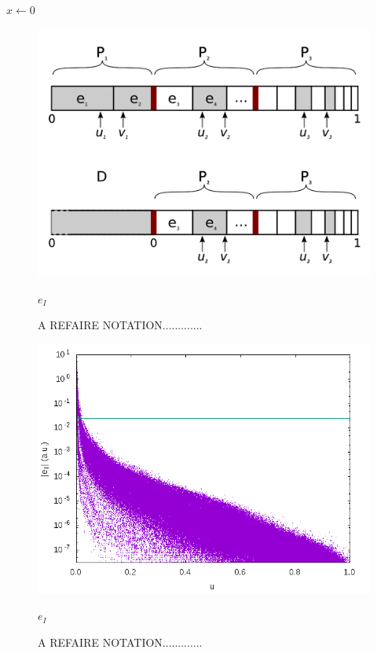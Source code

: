 \documentclass[./thesis.tex]{subfiles}
\begin{document}
\begin{algorithm}
	
					
	$x \gets 0$ \;
\end{algorithm}



\begin{figure}[h!]
	\begin{center}
		\includegraphics[width=0.9\columnwidth]{figures/pt2/move_to_deterministic}
		\caption{A REFAIRE NOTATION.............}
		\label{fig:move_to_deterministic}
		$e_I$
	\end{center}
\end{figure}

\begin{figure}[h!]
	\begin{center}
		\includegraphics[width=0.9\columnwidth]{figures/pt2/eI}
		\caption{A REFAIRE NOTATION.............}
		\label{fig:ei}
		$e_I$
	\end{center}
\end{figure}
\end{document}
